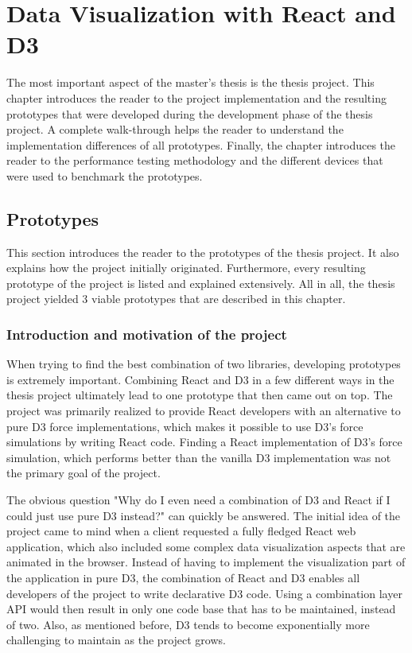 \chapter{Data Visualization with React and D3}
\label{cha:visualization}

The most important aspect of the master's thesis is the thesis project. This chapter introduces the reader to the project implementation and the resulting prototypes that were developed during the development phase of the thesis project. A complete walk-through helps the reader to understand the implementation differences of all prototypes. Finally, the chapter introduces the reader to the performance testing methodology and the different devices that were used to benchmark the prototypes.

\section{Prototypes}

This section introduces the reader to the prototypes of the thesis project. It also explains how the project initially originated. Furthermore, every resulting prototype of the project is listed and explained extensively. All in all, the thesis project yielded 3 viable prototypes that are described in this chapter. 

\subsection{Introduction and motivation of the project}

When trying to find the best combination of two libraries, developing prototypes is extremely important. Combining React and D3 in a few different ways in the thesis project ultimately lead to one prototype that then came out on top. The project was primarily realized to provide React developers with an alternative to pure D3 force implementations, which makes it possible to use D3's force simulations by writing React code. Finding a React implementation of D3's force simulation, which performs better than the vanilla D3 implementation was not the primary goal of the project.

The obvious question "Why do I even need a combination of D3 and React if I could just use pure D3 instead?" can quickly be answered. The initial idea of the project came to mind when a client requested a fully fledged React web application, which also included some complex data visualization aspects that are animated in the browser. Instead of having to implement the visualization part of the application in pure D3, the combination of React and D3 enables all developers of the project to write declarative D3 code. Using a combination layer API would then result in only one code base that has to be maintained, instead of two. Also, as mentioned before, D3 tends to become exponentially more challenging to maintain as the project grows.

